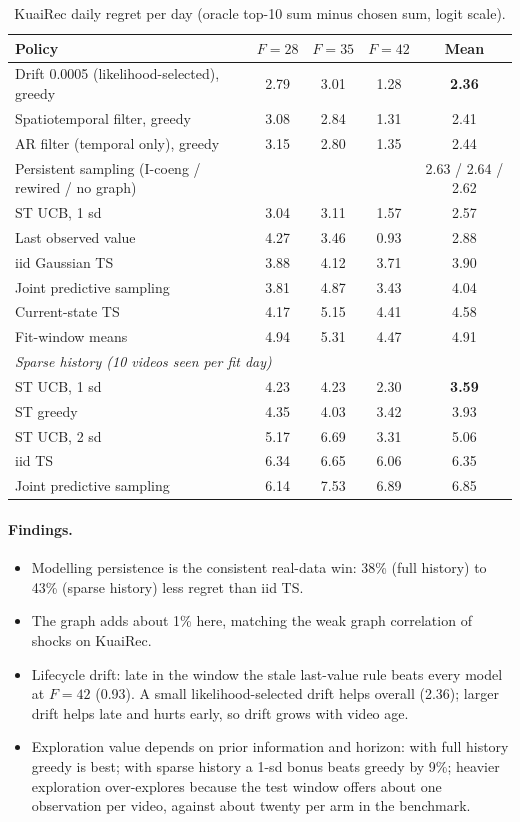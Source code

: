 \documentclass[11pt]{article}
\theoremstyle{definition}
\theoremstyle{remark}
\begin{document}
\begin{table}[t]\centering\small
\begin{tabular}{lcccc}
\toprule
Policy & $F=28$ & $F=35$ & $F=42$ & Mean \\
\midrule
Drift 0.0005 (likelihood-selected), greedy & 2.79 & 3.01 & 1.28 & \textbf{2.36} \\
Spatiotemporal filter, greedy & 3.08 & 2.84 & 1.31 & 2.41 \\
AR filter (temporal only), greedy & 3.15 & 2.80 & 1.35 & 2.44 \\
Persistent sampling (I-coeng / rewired / no graph) & & & & 2.63 / 2.64 / 2.62 \\
ST UCB, 1 sd & 3.04 & 3.11 & 1.57 & 2.57 \\
Last observed value & 4.27 & 3.46 & 0.93 & 2.88 \\
iid Gaussian TS & 3.88 & 4.12 & 3.71 & 3.90 \\
Joint predictive sampling & 3.81 & 4.87 & 3.43 & 4.04 \\
Current-state TS & 4.17 & 5.15 & 4.41 & 4.58 \\
Fit-window means & 4.94 & 5.31 & 4.47 & 4.91 \\
\midrule
\multicolumn{5}{l}{\emph{Sparse history (10 videos seen per fit day)}} \\
ST UCB, 1 sd & 4.23 & 4.23 & 2.30 & \textbf{3.59} \\
ST greedy & 4.35 & 4.03 & 3.42 & 3.93 \\
ST UCB, 2 sd & 5.17 & 6.69 & 3.31 & 5.06 \\
iid TS & 6.34 & 6.65 & 6.06 & 6.35 \\
Joint predictive sampling & 6.14 & 7.53 & 6.89 & 6.85 \\
\bottomrule
\end{tabular}
\caption{KuaiRec daily regret per day (oracle top-10 sum minus chosen sum, logit scale).}\label{tab:daily}
\end{table}

\paragraph{Findings.}
\begin{itemize}
\item Modelling persistence is the consistent real-data win: 38\% (full history) to 43\% (sparse history) less regret than iid TS.
\item The graph adds about 1\% here, matching the weak graph correlation of shocks on KuaiRec.
\item Lifecycle drift: late in the window the stale last-value rule beats every model at $F=42$ (0.93). A small likelihood-selected drift helps overall (2.36); larger drift helps late and hurts early, so drift grows with video age.
\item Exploration value depends on prior information and horizon: with full history greedy is best; with sparse history a 1-sd bonus beats greedy by 9\%; heavier exploration over-explores because the test window offers about one observation per video, against about twenty per arm in the benchmark.
\end{itemize}
\end{document}
